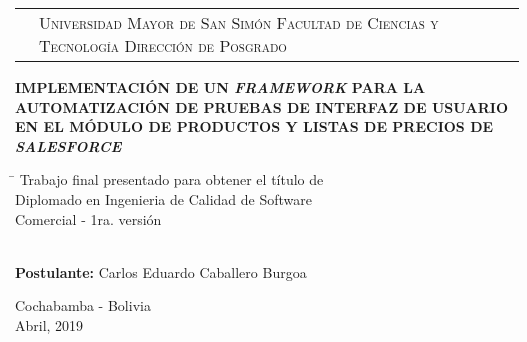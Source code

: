 \newcommand{\umsslogo}{
\adjustbox{valign=t}{}
}
\newcommand{\fcytlogo}{
\adjustbox{valign=t}{}
}

\begin{titlepage}

\begin{tabular}[t]{c p{8.6cm} c}
\umsslogo &
\vfill
\large{\textsc{Universidad Mayor de San Simón}} \newline
\large{\textsc{Facultad de Ciencias y Tecnología}} \newline
\large{\textsc{Dirección de Posgrado}} &
\fcytlogo \\
\end{tabular}
\vspace{3.5cm}
\begin{center}
\huge{\bf{IMPLEMENTACIÓN DE UN \emph{FRAMEWORK} PARA LA AUTOMATIZACIÓN DE
PRUEBAS DE INTERFAZ DE USUARIO EN EL MÓDULO DE PRODUCTOS Y LISTAS DE PRECIOS
DE \emph{SALESFORCE}}}
\end{center}
\vfill
\begin{tabbing}
\hspace{6cm}\=\+
Trabajo final presentado para obtener el título de \\
Diplomado en Ingenieria de Calidad de Software \\
Comercial - 1ra. versión\\
\\
\end{tabbing}
\vspace{3cm}
\textbf{Postulante:} Carlos Eduardo Caballero Burgoa\\
\begin{center}
Cochabamba - Bolivia\\
Abril, 2019
\end{center}
\end{titlepage}

